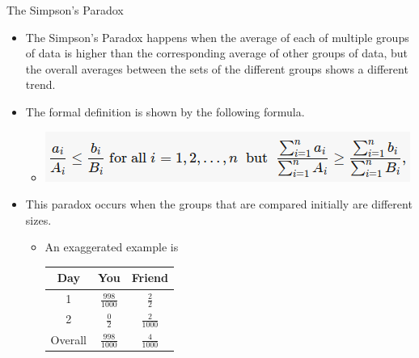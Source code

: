 \documentclass{beamer}
\begin{document}
\begin{frame}{The Simpson's Paradox}
    \begin{itemize}
        \item The Simpson's Paradox happens when the average of each of multiple groups of data is higher than the corresponding average of other groups of data, but the overall averages between the sets of the different groups shows a different trend.
        \item The formal definition is shown by the following formula.
        \begin{itemize}
            \item \includegraphics[scale=.4]{simpsonsparadox.png}
        \end{itemize}
        \item This paradox occurs when the groups that are compared initially are different sizes.
        \begin{itemize}
            \item An exaggerated example is
            \begin{center}
                \begin{tabular}{||c c c||} 
                    \hline
                    Day & You & Friend \\ [0.5ex] 
                    \hline\hline
                    1 & $\frac{998}{1000}$ & $\frac{2}{2}$ \\ 
                    \hline
                    2 & $\frac{0}{2}$ & $\frac{2}{1000}$ \\
                    \hline
                    Overall & $\frac{998}{1000}$ & $\frac{4}{1000}$ \\
                    \hline
                \end{tabular}
            \end{center}
        \end{itemize}
    \end{itemize}
\end{frame}
\end{document}
